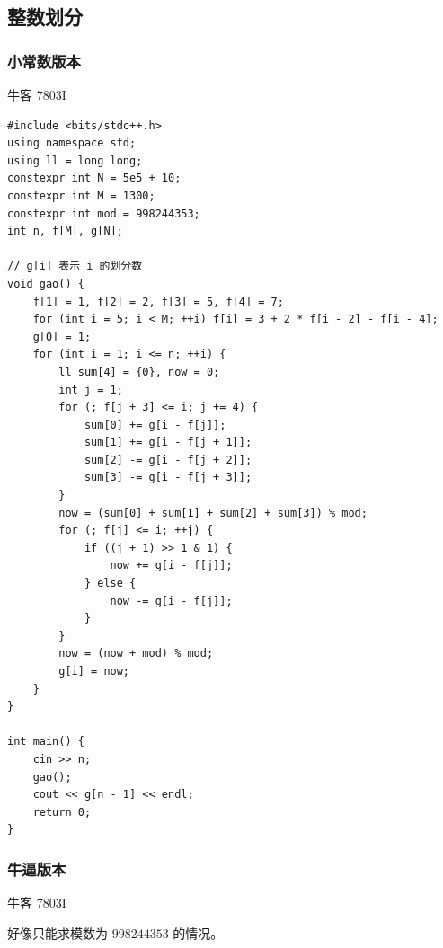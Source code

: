 \subsection{整数划分}

\subsubsection{小常数版本}

牛客 7803I

\begin{lstlisting}
#include <bits/stdc++.h>
using namespace std;
using ll = long long;
constexpr int N = 5e5 + 10; 
constexpr int M = 1300;
constexpr int mod = 998244353;
int n, f[M], g[N];

// g[i] 表示 i 的划分数
void gao() { 
	f[1] = 1, f[2] = 2, f[3] = 5, f[4] = 7;
	for (int i = 5; i < M; ++i) f[i] = 3 + 2 * f[i - 2] - f[i - 4];
    g[0] = 1;
    for (int i = 1; i <= n; ++i) {
		ll sum[4] = {0}, now = 0;
		int j = 1;
		for (; f[j + 3] <= i; j += 4) {
			sum[0] += g[i - f[j]];
			sum[1] += g[i - f[j + 1]];
			sum[2] -= g[i - f[j + 2]];
			sum[3] -= g[i - f[j + 3]];
		}
		now = (sum[0] + sum[1] + sum[2] + sum[3]) % mod;
		for (; f[j] <= i; ++j) {
			if ((j + 1) >> 1 & 1) {
				now += g[i - f[j]];
			} else {
				now -= g[i - f[j]];
			}
		}
		now = (now + mod) % mod;
		g[i] = now;
    }
}

int main() {
	cin >> n;
	gao();
	cout << g[n - 1] << endl;
	return 0;
}
\end{lstlisting}

\subsubsection{牛逼版本}

牛客 7803I \par

好像只能求模数为 $998244353$ 的情况。

